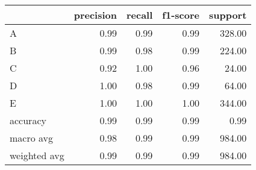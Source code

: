 \begin{tabular}{|l|r|r|r|r|}
\hline
{} &  precision &  recall &  f1-score &  support \\
\hline
A            &       0.99 &    0.99 &      0.99 &   328.00 \\
B            &       0.99 &    0.98 &      0.99 &   224.00 \\
C            &       0.92 &    1.00 &      0.96 &    24.00 \\
D            &       1.00 &    0.98 &      0.99 &    64.00 \\
E            &       1.00 &    1.00 &      1.00 &   344.00 \\
accuracy     &       0.99 &    0.99 &      0.99 &     0.99 \\
macro avg    &       0.98 &    0.99 &      0.99 &   984.00 \\
weighted avg &       0.99 &    0.99 &      0.99 &   984.00 \\
\hline
\end{tabular}
